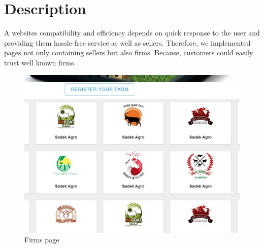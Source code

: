 \documentclass[a4paper,12pt]{report}
\begin{document}
\section*{Description}
A websites compatibility and efficiency depends on quick response to the user and providing them hassle-free service as well as sellers. Therefore, we implemented pages not only containing sellers but also firms. Because, customers could easily trust well known firms. 
\begin{figure}[H]
\centering
\includegraphics[keepaspectratio, width=12cm]{firm.jpg}
\caption{Firms page}
\label{firms}
\end{figure}
\end{document}
